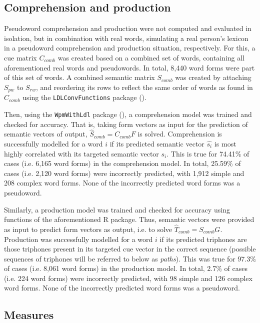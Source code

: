 \subsection{Comprehension and production}\label{section05_1_5}

Pseudoword comprehension and production were not computed and evaluated in isolation, but in combination with real words, simulating a real person’s lexicon in a pseudoword comprehension and production situation, respectively. For this, a cue matrix $C_{comb}$ was created based on a combined set of words, containing all aforementioned real words and pseudowords. In total, 8,440 word forms were part of this set of words. A combined semantic matrix $S_{comb}$ was created by attaching $S_{pw}$ to $S_{rw}$, and reordering its rows to reflect the same order of words as found in $C_{comb}$ using the \texttt{LDLConvFunctions} package (\cite{Schmitz2021ldlconv}).

Then, using the \texttt{WpmWithLdl} package (\cite{Baayen2019wpm}), a comprehension model was trained and checked for accuracy. That is, taking form vectors as input for the prediction of semantic vectors of output, $\hat{S}_{comb}=C_{comb}F$ is solved. Comprehension is successfully modelled for a word $i$ if its predicted semantic vector $\hat{s_i}$ is most highly correlated with its targeted semantic vector $s_i$. This is true for 74.41\% of cases (i.e. 6,165 word forms) in the comprehension model. In total, 25.59\% of cases (i.e. 2,120 word forms) were incorrectly predicted, with 1,912 simple and 208 complex word forms. None of the incorrectly predicted word forms was a pseudoword.

Similarly, a production model was trained and checked for accuracy using functions of the aforementioned R package. Thus, semantic vectors were provided as input to predict form vectors as output, i.e. to solve $\hat{T}_{comb}=S_{comb}G$. Production was successfully modelled for a word $i$ if its predicted triphones are those triphones present in its targeted cue vector in the correct sequence (possible sequences of triphones will be referred to below as \textit{paths}). This was true for 97.3\% of cases (i.e. 8,061 word forms) in the production model. In total, 2.7\% of cases (i.e. 224 word forms) were incorrectly predicted, with 98 simple and 126 complex word forms. None of the incorrectly predicted word forms was a pseudoword.

\subsection{Measures}\label{section05_1_6}

